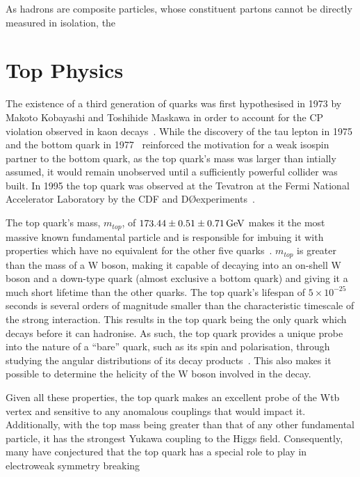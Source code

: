 As hadrons are composite particles, whose constituent partons cannot be directly measured in isolation,  the


\section{Top Physics}\label{sec:top-physics}
The existence of a third generation of quarks was first hypothesised in 1973 by Makoto Kobayashi and Toshihide Maskawa in order to account for the CP violation observed in kaon decays~\cite{Kobayashi:1973fv}.
While the discovery of the tau lepton in 1975 and the bottom quark in 1977~\cite{Herb:1977ek} reinforced the motivation for a weak isospin partner to the bottom quark, as the top quark's mass was larger than intially assumed, it would remain unobserved until a sufficiently powerful collider was built.
In 1995 the top quark was observed at the Tevatron at the Fermi National Accelerator Laboratory by the CDF and D\O experiments~\cite{Abe:1995hr,D0:1995jca}.

The top quark's mass, $m_{top}$, of $173.44 \pm 0.51 \pm 0.71 \,\text{Ge\hspace{-.08em}V}$ makes it the most massive known fundamental particle and is responsible for imbuing it with properties which have no equivalent for the other five quarks~\cite{Patrignani:2016xqp}.
$m_{top}$ is greater than the mass of a W boson, making it capable of decaying into an on-shell W boson and a down-type quark (almost exclusive a bottom quark) and giving it a much short lifetime than the other quarks.
The top quark's lifespan of $5 \times 10^{-25}$ seconds is several orders of magnitude smaller than the characteristic timescale of the strong interaction.
This results in the top quark being the only quark which decays before it can hadronise. 
As such, the top quark provides a unique probe into the nature of a ``bare'' quark, such as its spin and polarisation, through studying the angular distributions of its decay products~\cite{Khachatryan:2015dzz}.
This also makes it possible to determine the helicity of the W boson involved in the decay.

Given all these properties, the top quark makes an excellent probe of the Wtb vertex and sensitive to any anomalous couplings that would impact it.
Additionally, with the top mass being greater than that of any other fundamental particle, it has the strongest Yukawa coupling to the Higgs field.
Consequently, many have conjectured that the top quark has a special role to play in electroweak symmetry breaking~\cite{Giammanco:2017xyn}
 
